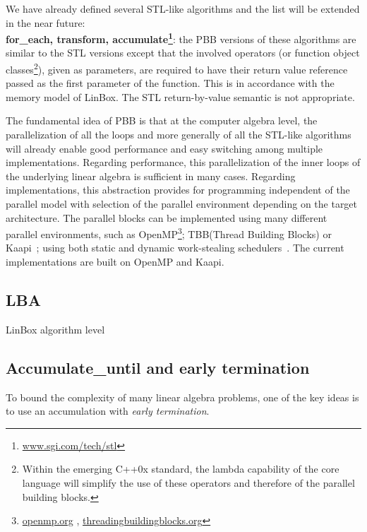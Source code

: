\documentclass{article}
\newcommand{\linbox}{{\sc LinBox}\xspace}
\newcommand{\kaapi}{{\sc Kaapi}\xspace}
\newcommand{\Accumulatewhile}{ \textbf{Accumulate\_until} }
\begin{document}
  We have already defined several STL-like algorithms and the list
  will be extended in the near future:\\
  {\bf for\_each, transform,
    accumulate\footnote{\url{www.sgi.com/tech/stl}}}: the PBB versions of
  these algorithms are similar to the STL versions except that the
  involved operators (or function object classes\footnote{Within the
    emerging C++0x standard, the lambda capability of the core language
    will simplify the use of these operators and therefore of the parallel
    building blocks.}), given as parameters, are required to have their
  return value reference passed as the first parameter of the
  function. This is in accordance with the memory model of \linbox. The
  STL return-by-value semantic is not appropriate.
  
  The fundamental idea of PBB is that at the computer algebra
  level, the parallelization of all the loops and more generally of all
  the STL-like algorithms will already enable good performance and
  easy switching among multiple implementations.
  Regarding performance, this parallelization of the inner loops of
  the underlying linear algebra is sufficient in many cases.
  Regarding implementations, this
  abstraction provides for programming independent of the
  parallel model with selection of the parallel environment
  depending on the target architecture.
  The parallel blocks can be implemented using many different parallel
  environments, such as
  OpenMP\footnote{\url{openmp.org} \cite{Chapman:2007:openmp},
    \url{threadingbuildingblocks.org}}; 
  TBB\footnotemark[7] (Thread Building Blocks)
   or
  \kaapi~\cite{inproceedingsgautier.gbp_ktsrsf_07}; using
  both static and dynamic work-stealing
  schedulers~\cite{con-traore.trmgb_08}.
  The current implementations are built on OpenMP and \kaapi.

\subsection{LBA}
\begin{algorithm}[ht]
\caption{LinBox algorithm level}\label{alg:bbit}
\end{algorithm}


\subsection{\Accumulatewhile and early termination}
To bound the complexity of many linear algebra problems, one of the
key ideas is to use an accumulation with {\em early termination}.
\end{document}
